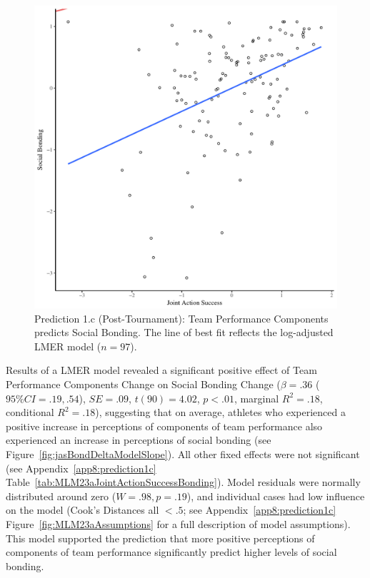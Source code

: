 \begin{CJK}{UTF8}{gbsn}
  \begin{figure}[htbp]
    \centering
  \includegraphics[scale=.5]{images/jasBondModelSlope.pdf}
    \caption{Prediction 1.c (Post-Tournament): Team Performance Components predicts Social Bonding. The line of best fit reflects the log-adjusted LMER model ($n = 97$).}
    \label{fig:jasBondModelSlope}
  \end{figure}


Results of a LMER model revealed a significant positive effect of Team Performance Components Change on Social Bonding Change ($\beta = .36$ ($95\% CI =  .19, .54$), $SE = .09$, $t(90) = 4.02$, $p < .01$, marginal $R^2 = .18$, conditional $R^2 = .18$), suggesting that on average, athletes who experienced a positive increase in perceptions of components of team performance also experienced an increase in perceptions of social bonding (see Figure~\ref{fig:jasBondDeltaModelSlope}). All other fixed effects were not significant (see Appendix~\ref{app8:prediction1c} Table~\ref{tab:MLM23aJointActionSuccessBonding}). Model residuals were normally distributed around zero ($W = .98, p = .19$), and individual cases had low influence on the model (Cook's Distances all $< .5$; see Appendix~\ref{app8:prediction1c} Figure~\ref{fig:MLM23aAssumptions} for a full description of model assumptions).  This model supported the prediction that more positive perceptions of components of team performance significantly predict higher levels of social bonding.



\end{CJK}

